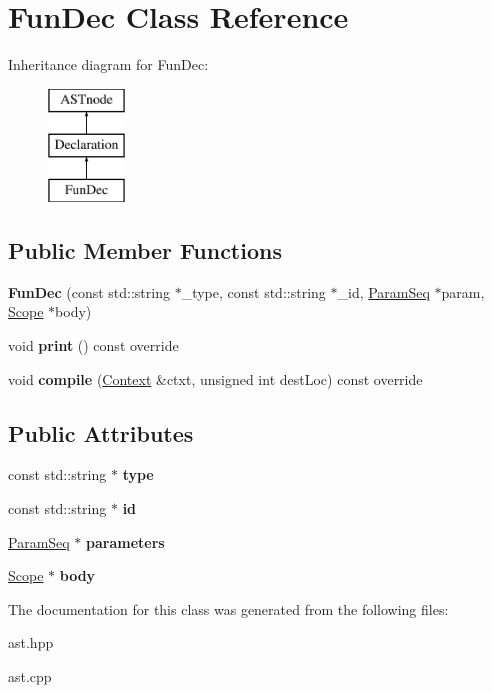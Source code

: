 \hypertarget{class_fun_dec}{}\section{Fun\+Dec Class Reference}
\label{class_fun_dec}
Inheritance diagram for Fun\+Dec\+:\begin{figure}[H]
\begin{center}
\leavevmode
\includegraphics[height=3.000000cm]{class_fun_dec}
\end{center}
\end{figure}
\subsection*{Public Member Functions}
\begin{DoxyCompactItemize}
\item 
\mbox{\label{class_fun_dec_abb5640a7ff921a46153d65b085d3f418}} 
{\bfseries Fun\+Dec} (const std\+::string $\ast$\+\_\+type, const std\+::string $\ast$\+\_\+id, \hyperlink{class_param_seq}{Param\+Seq} $\ast$param, \hyperlink{class_scope}{Scope} $\ast$body)
\item 
\mbox{\label{class_fun_dec_a3173002f9e06597f1bc6946dad5e82ea}} 
void {\bfseries print} () const override
\item 
\mbox{\label{class_fun_dec_ac33111c84de9dbc2e268f0c3de0a3d66}} 
void {\bfseries compile} (\hyperlink{class_context}{Context} \&ctxt, unsigned int dest\+Loc) const override
\end{DoxyCompactItemize}
\subsection*{Public Attributes}
\begin{DoxyCompactItemize}
\item 
\mbox{\label{class_fun_dec_aa0b19bf88acf2d9b23ba4ede1e8ede0b}} 
const std\+::string $\ast$ {\bfseries type}
\item 
\mbox{\label{class_fun_dec_a0fbbe98cd292b02d6268a448cb05aeea}} 
const std\+::string $\ast$ {\bfseries id}
\item 
\mbox{\label{class_fun_dec_aa5e931e5491a83372139f0afdf3156cc}} 
\hyperlink{class_param_seq}{Param\+Seq} $\ast$ {\bfseries parameters}
\item 
\mbox{\label{class_fun_dec_a4c67d8e464a02b76518327537f5247be}} 
\hyperlink{class_scope}{Scope} $\ast$ {\bfseries body}
\end{DoxyCompactItemize}


The documentation for this class was generated from the following files\+:\begin{DoxyCompactItemize}
\item 
ast.\+hpp\item 
ast.\+cpp\end{DoxyCompactItemize}
